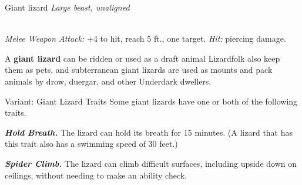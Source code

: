 \documentclass[10pt,twoside,twocolumn,openany]{book}
\newcommand\impact[1]{
	\textbf{\textit{#1}}
}
\begin{document}
\begin{monsterboxnobg}{Giant lizard}
	\textit{Large beast, unaligned}\\
	\hline
	\basics[
		armorclass	= 10,
		hitpoints 		= \dice{3d10 + 3},
		speed		= {30 ft., climb 30 ft.}
	]
	\hline
	\stats[
		STR	= \stat{15},
		DEX	= \stat{12},
		CON	= \stat{13},
		INT	= \stat{2},
		WIS	= \stat{10},
		CHA	= \stat{5}
	]
	\hline
	\details[
		skills			= {},
		senses		= {darkvision 30 ft., passive Perception 10},
		languages		= {-},
		challenge		= 1/4
	]
	\hline \\[1mm]
	\begin{monsteraction}[Bite]
		\textit{Melee Weapon Attack:} +4 to hit, reach 5 ft., one target. \textit{Hit:}  piercing damage.
	\end{monsteraction}
	
	A \textbf{giant lizard} can be ridden or used as a draft animal Lizardfolk also keep them as pets, and subterranean giant lizards are used as mounts and pack animals by drow, duergar, and other Underdark dwellers.
	
	\begin{paperbox}{Variant: Giant Lizard Traits}
		Some giant lizards have one or both of the following traits.
		
		\impact{Hold Breath.} The lizard can hold its breath for 15 minutes. (A lizard that has this trait also has a swimming speed
of 30 feet.)
		
		\impact{Spider Climb.} The lizard can climb difficult surfaces, including upside down on ceilings, without needing to make an ability check.
	\end{paperbox}
\end{monsterboxnobg}
\end{document}

